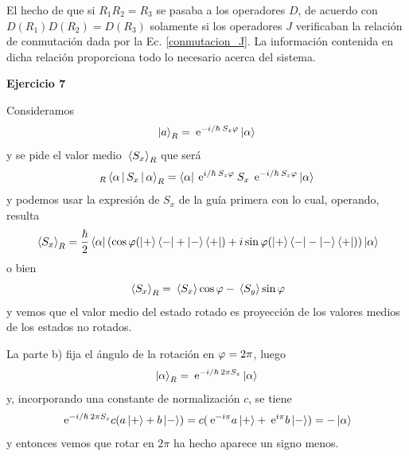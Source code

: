 \documentclass[10pt,oneside]{CBFT_book}
\begin{document}
El hecho de que si $R_1 R_2 = R_3$ se pasaba a los operadores $D$, de acuerdo con $ D(R_1) D(R_2) = D(R_3)$ 
solamente si los operadores $J$ verificaban la relación de conmutación dada por la Ec. \eqref{conmutacion_J}.
La información contenida en dicha relación proporciona todo lo necesario acerca del sistema.

\begin{ejemplo}{\bf Ejercicio 7}
 
Consideramos 
\[
	\Ket{a}_R = \:\mathrm{e}^{ - i /\hbar \: S_z \varphi } \Ket{\alpha}
\]
y se pide el valor medio $\:\left\langle S_x \right\rangle_R$ que será
\[
	_R\Braket{\alpha|S_x|\alpha}_R = \Bra{\alpha} \:\mathrm{e}^{i /\hbar \: S_z \varphi } \:
		S_x \: \:\mathrm{e}^{-i /\hbar \: S_z \varphi } \Ket{\alpha}
\]
y podemos usar la expresión de $S_x$ de la guía primera con lo cual, operando,
resulta
\[
	\:\left\langle S_x \right\rangle_R = \frac{\hbar}{2}
	\Bra{\alpha}
	\left( \cos\varphi (\Ket{+}\Bra{-} + \Ket{-}\Bra{+}) + i \sin\varphi (\Ket{+}\Bra{-} - \Ket{-}\Bra{+}) \right)
	\Ket{\alpha}
\]
o bien
\[
	\:\left\langle S_x \right\rangle_R = \:\left\langle S_x \right\rangle \cos\varphi - \:\left\langle S_y \right\rangle \sin\varphi
\]
y vemos que el valor medio del estado rotado es proyección de los valores medios
de los estados no rotados.

La parte b) fija el ángulo de la rotación en $\varphi=2\pi$, luego
\[
	\Ket{\alpha}_R = \:\mathrm{e}^{-i/\hbar \: 2\pi S_z} \Ket{\alpha}
\]
y, incorporando una constante de normalización $c$, se tiene
\[
	\:\mathrm{e}^{-i/\hbar \: 2\pi S_z} c ( a \Ket{+} + b \Ket{-} ) =
	c ( \:\mathrm{e}^{-i\pi} a \Ket{+} + \:\mathrm{e}^{i\pi} b \Ket{-} ) = - \Ket{\alpha}
\]
y entonces vemos que rotar en $2\pi$ ha hecho aparece un signo menos.
 
\end{ejemplo}
\end{document}
